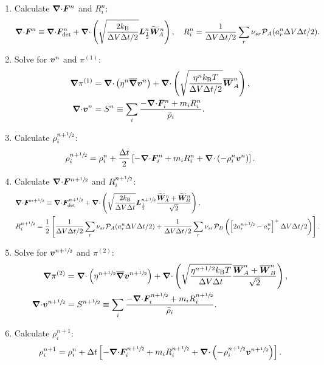 \documentclass[
10pt
showpacs, showkeys,
amsmath,amssymb,
aps,
pre,
floatfix,
]{revtex4-1}
\newcommand{\divg}{{\V\nabla\cdot}}                       %
\newcommand{\paren}[1]{{(#1)}}                            %
\begin{document}
\begin{enumerate}

\item Calculate $\divg\V{F}^n$ and $R^n_i$:
\begin{equation}
\divg\V{F}^n \equiv \divg\V{F}^n_\mathrm{det} + \divg\left( \sqrt{ \frac{2k_\mathrm{B}}{\D{V}\D{t}/2} } \V{L}^n_{\frac12} \widetilde{\V{W}}^n_A \right),
\quad R^n_i = \frac{1}{\D{V}\D{t}/2} \sum_r \nu_{sr} \mathcal{P}_A(a^n_r\D{V}\D{t}/2).
\end{equation}

\item Solve for $\boldsymbol{v}^n$ and $\pi^\paren{1}$:
\begin{align}
\grad\pi^\paren{1} & = \divg\left( \eta^n \overline{\grad}\V{v}^n \right)
+ \divg\left( \sqrt{\frac{\eta^n k_\mathrm{B}T}{\D{V}\D{t}/2}} \overline{\V{W}}^n_A \right),
\\
\divg\V{v}^n & = S^n\equiv \sum_i \frac{-\divg\V{F}^n_i + m_i R^n_i }{\bar{\rho}_i}.
\end{align}

\item Calculate $\rho^{n+\sfrac{1}{2}}_i$:
\begin{equation}
\rho^{n+\myhalf}_i = \rho^n_i + \frac{\D{t}}{2} \left[ -\divg\V{F}^n_i + m_i R^n_i + \divg\left( -\rho^n_i \V{v}^n \right) \right].
\end{equation}

\item Calculate $\divg\V{F}^{n+\myhalf}$ and $R^{n+\sfrac{1}{2}}_i$:
\begin{align}
&\divg\V{F}^{n+\myhalf} \equiv \divg\V{F}_\mathrm{det}^{n+\myhalf} + \divg\left( \sqrt{ \frac{2k_\mathrm{B}}{\D{V}\D{t}} } \V{L}^{n+\myhalf}_{\frac12} \frac{ \widetilde{\V{W}}^n_A + \widetilde{\V{W}}^n_B }{\sqrt{2}} \right), \\
&R^{n+\myhalf}_i = \frac{1}{2}\left[ \frac{1}{\D{V}\D{t}/2} \sum_r \nu_{sr} \mathcal{P}_A(a^n_r\D{V}\D{t}/2) + \frac{1}{\D{V}\D{t}/2} \sum_r \nu_{sr} \mathcal{P}_B\left( \left[ 2 a^{n+\myhalf}_r - a^n_r \right]^+ \D{V}\D{t}/2 \right) \right].
\end{align}

\item Solve for $\boldsymbol{v}^{n+\sfrac{1}{2}}$ and $\pi^\paren{2}$:
\begin{align}
\grad\pi^\paren{2} &= \divg\left( \eta^{n+\myhalf} \overline{\grad}\V{v}^{n+\myhalf} \right) 
+ \divg\left( \sqrt{\frac{\eta^{n+1/2} k_\mathrm{B}T}{\D{V}\D{t}} } \frac{\overline{\V{W}}^n_A + \overline{\V{W}}^n_B}{\sqrt{2}} \right),\\
\divg\V{v}^{n+\myhalf} &= S^{n+\myhalf}\equiv \sum_i \frac{-\divg\V{F}^{n+\myhalf}_i + m_i R^{n+\myhalf}_i }{\bar{\rho}_i}.
\end{align}

\item Calculate $\rho^{n+1}_i$:
\begin{equation}
\rho^{n+1}_i = \rho^n_i + \D{t} \left[ -\divg\V{F}^{n+\myhalf}_i + m_i R^{n+\myhalf}_i + \divg\left( -\rho^{n+\myhalf}_i \V{v}^{n+\myhalf} \right) \right].
\end{equation} 

\end{enumerate}
\end{document}
